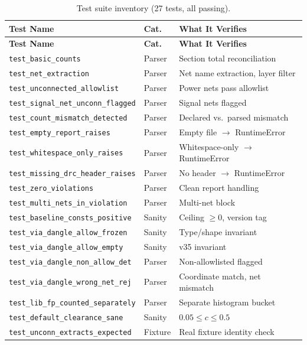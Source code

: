 \documentclass[11pt,a4paper]{article}
\begin{document}
{\small
\begin{longtable}{@{}p{5.2cm}p{1.6cm}p{5.8cm}@{}}
\caption{Test suite inventory (27 tests, all passing).}
\label{tab:tests} \\
\toprule
\textbf{Test Name} & \textbf{Cat.} & \textbf{What It Verifies} \\
\midrule
\endfirsthead
\toprule
\textbf{Test Name} & \textbf{Cat.} & \textbf{What It Verifies} \\
\midrule
\endhead
\texttt{test\_basic\_counts} & Parser & Section total reconciliation \\
\texttt{test\_net\_extraction} & Parser & Net name extraction, layer filter \\
\texttt{test\_unconnected\_allowlist} & Parser & Power nets pass allowlist \\
\texttt{test\_signal\_net\_unconn\_flagged} & Parser & Signal nets flagged \\
\texttt{test\_count\_mismatch\_detected} & Parser & Declared vs.\ parsed mismatch \\
\texttt{test\_empty\_report\_raises} & Parser & Empty file $\to$ RuntimeError \\
\texttt{test\_whitespace\_only\_raises} & Parser & Whitespace-only $\to$ RuntimeError \\
\texttt{test\_missing\_drc\_header\_raises} & Parser & No header $\to$ RuntimeError \\
\texttt{test\_zero\_violations} & Parser & Clean report handling \\
\texttt{test\_multi\_nets\_in\_violation} & Parser & Multi-net block \\
\texttt{test\_baseline\_consts\_positive} & Sanity & Ceiling $\geq 0$, version tag \\
\texttt{test\_via\_dangle\_allow\_frozen} & Sanity & Type/shape invariant \\
\texttt{test\_via\_dangle\_allow\_empty} & Sanity & v35 invariant \\
\texttt{test\_via\_dangle\_non\_allow\_det} & Parser & Non-allowlisted flagged \\
\texttt{test\_via\_dangle\_wrong\_net\_rej} & Parser & Coordinate match, net mismatch \\
\texttt{test\_lib\_fp\_counted\_separately} & Parser & Separate histogram bucket \\
\texttt{test\_default\_clearance\_sane} & Sanity & $0.05 \leq c \leq 0.5$ \\
\texttt{test\_unconn\_extracts\_expected} & Fixture & Real fixture identity check \\

\end{longtable}}
\end{document}
